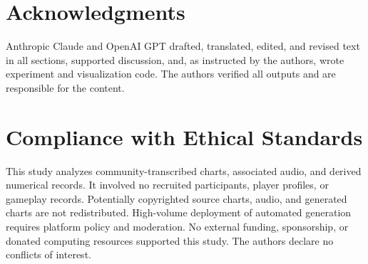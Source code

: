 \documentclass[letterpaper]{article}
\begin{document}
\section{Acknowledgments}
Anthropic Claude and OpenAI GPT drafted, translated, edited, and revised text in all
sections, supported discussion, and, as instructed by the authors, wrote
experiment and visualization code. The authors verified all outputs and are
responsible for the content.

\clearpage
\section{Compliance with Ethical Standards}
This study analyzes community-transcribed charts, associated audio, and
derived numerical records. It involved no recruited participants, player
profiles, or gameplay records. Potentially copyrighted source charts,
audio, and generated charts are not redistributed. High-volume deployment of automated generation
requires platform policy and moderation. No external funding, sponsorship,
or donated computing resources supported this study. The authors declare
no conflicts of interest.


\end{document}

